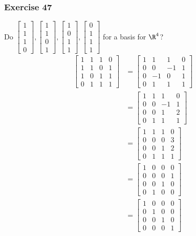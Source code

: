 \documentclass{math}
\begin{document}
\subsubsection*{Exercise 47}
Do \( \begin{bmatrix}1 \\ 1 \\ 1 \\ 0\end{bmatrix},\begin{bmatrix}1 \\ 1 \\ 0 \\
1\end{bmatrix},\begin{bmatrix}1 \\ 0 \\ 1 \\ 1\end{bmatrix},\begin{bmatrix}0 \\
1 \\ 1 \\ 1\end{bmatrix} \) for a basis for \( \R^4 \)?
\begin{align*}
  \begin{bmatrix}
    1 & 1 & 1 & 0 \\
    1 & 1 & 0 & 1 \\
    1 & 0 & 1 & 1 \\
    0 & 1 & 1 & 1
  \end{bmatrix} &= \begin{bmatrix}
    1 & 1 & 1 & 0 \\
    0 & 0 & -1 & 1 \\
    0 & -1 & 0 & 1 \\
    0 & 1 & 1 & 1
  \end{bmatrix} \\
  &= \begin{bmatrix}
    1 & 1 & 1 & 0 \\
    0 & 0 & -1 & 1 \\
    0 & 0 & 1 & 2 \\
    0 & 1 & 1 & 1
  \end{bmatrix} \\
  &= \begin{bmatrix}
    1 & 1 & 1 & 0 \\
    0 & 0 & 0 & 3 \\
    0 & 0 & 1 & 2 \\
    0 & 1 & 1 & 1
  \end{bmatrix} \\
  &= \begin{bmatrix}
    1 & 0 & 0 & 0 \\
    0 & 0 & 0 & 1 \\
    0 & 0 & 1 & 0 \\
    0 & 1 & 0 & 0
  \end{bmatrix} \\
  &= \begin{bmatrix}
    1 & 0 & 0 & 0 \\
    0 & 1 & 0 & 0 \\
    0 & 0 & 1 & 0 \\
    0 & 0 & 0 & 1
  \end{bmatrix}
\end{align*}
\end{document}
